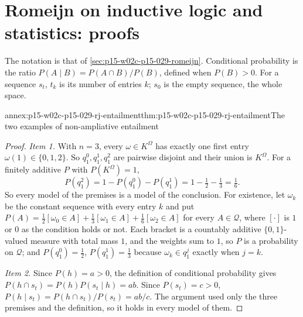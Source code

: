 \section{Romeijn on inductive logic and statistics: proofs}
\label{sec:annex-p15-w02c-p15-029-romeijn}

The notation is that of \cref{sec:p15-w02c-p15-029-romeijn}. Conditional
probability is the ratio \(P(A\mid B)=P(A\cap B)/P(B)\), defined when
\(P(B)>0\). For a sequence \(s_t\), \(t_k\) is its number of entries
\(k\); \(s_0\) is the empty sequence, the whole space.

\begin{annexitem}{annex:p15-w02c-p15-029-rj-entailment}{thm:p15-w02c-p15-029-rj-entailment}{The two examples of non-ampliative entailment}
\begin{proof}
\emph{Item 1.} With \(n=3\), every \(\omega\in K^{\Omega}\) has exactly
one first entry \(\omega(1)\in\{0,1,2\}\). So \(q^0_1,q^1_1,q^2_1\) are
pairwise disjoint and their union is \(K^{\Omega}\). For a finitely
additive \(P\) with \(P(K^{\Omega})=1\),
\[
 P(q^2_1)=1-P(q^0_1)-P(q^1_1)=1-\tfrac12-\tfrac13=\tfrac16 .
\]
So every model of the premises is a model of the conclusion. For
existence, let \(\omega_k\) be the constant sequence with every entry
\(k\) and put
\(P(A)=\tfrac12[\omega_0\in A]+\tfrac13[\omega_1\in A]+\tfrac16[\omega_2\in A]\)
for every \(A\in\mathcal Q\), where \([\cdot]\) is \(1\) or \(0\) as the
condition holds or not. Each bracket is a countably additive
\(\{0,1\}\)-valued measure with total mass \(1\), and the weights sum to
\(1\), so \(P\) is a probability on \(\mathcal Q\); and
\(P(q^0_1)=\tfrac12\), \(P(q^1_1)=\tfrac13\) because \(\omega_k\in q^j_1\)
exactly when \(j=k\).

\emph{Item 2.} Since \(P(h)=a>0\), the definition of conditional
probability gives \(P(h\cap s_t)=P(h)P(s_t\mid h)=ab\). Since
\(P(s_t)=c>0\), \(P(h\mid s_t)=P(h\cap s_t)/P(s_t)=ab/c\). The argument
used only the three premises and the definition, so it holds in every
model of them.
\end{proof}
\end{annexitem}

